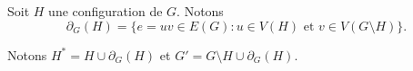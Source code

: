 \documentclass{beamer}
\begin{document}
\begin{frame}
%
%
%


Soit $H$ une configuration de $G$. Notons
$$
\partial_G(H) = \{e =uv \in E(G) : u \in V(H)\textrm{ et }v \in V(G \setminus H)\}.
$$ 



Notons $H^* = H \cup \partial_G(H)$ et $G'=G\setminus H \cup \partial_G(H)$.
\end{frame}

\end{document}
